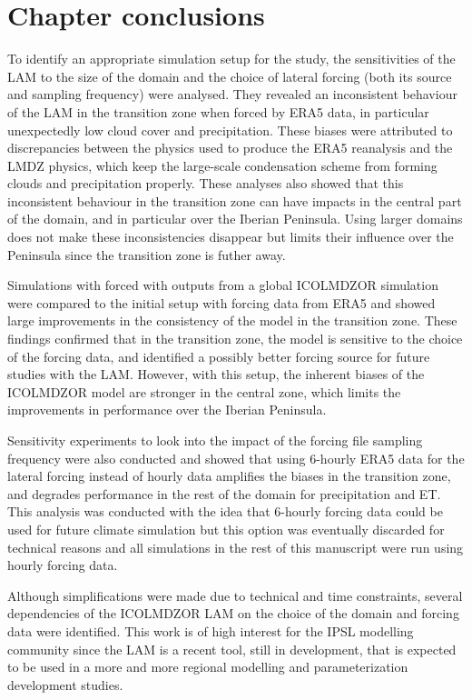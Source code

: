 \clearpage

\section{Chapter conclusions}

To identify an appropriate simulation setup for the study, the sensitivities of the LAM to the size of the domain and the choice of lateral forcing (both its source and sampling frequency) were analysed. They revealed an inconsistent behaviour of the LAM in the transition zone when forced by ERA5 data, in particular unexpectedly low cloud cover and precipitation. These biases were attributed to discrepancies between the physics used to produce the ERA5 reanalysis and the LMDZ physics, which keep the large-scale condensation scheme from forming clouds and precipitation properly.
These analyses also showed that this inconsistent behaviour in the transition zone can have impacts in the central part of the domain, and in particular over the Iberian Peninsula. Using larger domains does not make these inconsistencies disappear but limits their influence over the Peninsula since the transition zone is futher away.

Simulations with forced with outputs from a global ICOLMDZOR simulation were compared to the initial setup with forcing data from ERA5 and showed large improvements in the consistency of the model in the transition zone. These findings confirmed that in the transition zone, the model is sensitive to the choice of the forcing data, and identified a possibly better forcing source for future studies with the LAM. However, with this setup, the inherent biases of the ICOLMDZOR model are stronger  in the central zone, which limits the improvements in performance over the Iberian Peninsula.

Sensitivity experiments to look into the impact of the forcing file sampling frequency were also conducted and showed that using 6-hourly ERA5 data for the lateral forcing instead of hourly data amplifies the biases in the transition zone, and degrades performance in the rest of the domain for precipitation and ET. This analysis was conducted with the idea that 6-hourly forcing data could be used for future climate simulation but this option was eventually discarded for technical reasons and all simulations in the rest of this manuscript were run using hourly forcing data.

Although simplifications were made due to technical and time constraints, several dependencies of the ICOLMDZOR LAM on the choice of the domain and forcing data were identified. This work is of high interest for the IPSL modelling community since the LAM is a recent tool, still in development, that is expected to be used in a more and more regional modelling and parameterization development studies.
